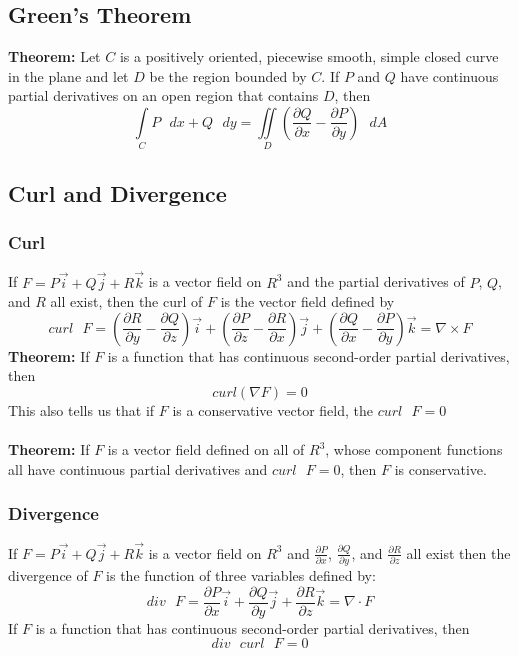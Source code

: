 \documentclass[11pt]{article}
\begin{document}
\subsection{Green's Theorem}
\textbf{Theorem:} Let $C$ is a positively oriented, piecewise smooth, simple closed curve  in the plane and let $D$ be the region bounded by $C$. If $P$ and $Q$ have continuous partial derivatives on an open region that contains $D$, then
$$ \int\limits_{C} P\text{ }dx +Q\text{ }dy = \iint\limits_{D} \left(\frac{\partial Q}{\partial x} - \frac{\partial P}{\partial y}\right) \text{ }dA$$
\subsection{Curl and Divergence}
\subsubsection{Curl}
If $F = P\vec{i} + Q\vec{j}+ R\vec{k}$ is a vector field on $R^3$ and the partial derivatives of $P$, $Q$, and $R$ all exist, then the curl of $F$ is the vector field defined by 
$$ curl\text{ } F = \left(\frac{\partial R}{\partial y} - \frac{\partial Q}{\partial z}\right) \vec{i} + \left(\frac{\partial P}{\partial z} - \frac{\partial R}{\partial x}\right) \vec{j} + \left(\frac{\partial Q}{\partial x} - \frac{\partial P}{\partial y}\right) \vec{k} = \nabla \times F$$
\textbf{Theorem:} If $F$ is a function that has continuous second-order partial derivatives, then
$$ curl(\nabla F) = 0$$
This also tells us that if $F$ is a conservative vector field, the $curl \text{ } F = 0$
\\ \\
\textbf{Theorem:} If $F$ is a vector field defined on all of $R^3$, whose component functions all have continuous partial derivatives and $curl \text{ } F = 0$, then $F$ is conservative.
\subsubsection{Divergence}
If $F = P\vec{i} + Q\vec{j}+ R\vec{k}$ is a vector field on $R^3$ and $\frac{\partial P}{\partial x}$, $\frac{\partial Q}{\partial y}$, and $\frac{\partial R}{\partial z}$ all exist then the divergence of $F$ is the function of three variables defined by:
$$ div \text{ } F = \frac{\partial P}{\partial x}\vec{i} +\frac{\partial Q}{\partial y}\vec{j} + \frac{\partial R}{\partial z}\vec{k} = \nabla \cdot F$$
If $F$ is a function that has continuous second-order partial derivatives, then
$$ div \text{ } curl \text { }F  = 0$$
\end{document}
